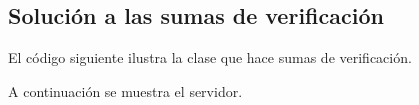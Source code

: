 \documentclass[letterpaper,10pt,spanish]{sphinxmanual}
\begin{document}
\subsection{Solución a las sumas de verificación}
\label{\detokenize{textos/tema3:solucion-a-las-sumas-de-verificacion}}
El código siguiente ilustra la clase que hace sumas de verificación.

\begin{sphinxVerbatim}[commandchars=\\\{\}]
   

         
           
                 
              
         
\end{sphinxVerbatim}

A continuación se muestra el servidor.
\end{document}
